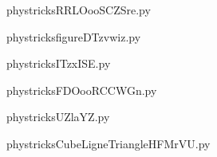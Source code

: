 
    \newcommand{\CaptionFigRRLOooSCZSre}{<+Type your caption here+>}
    \begin{center}
        
    \end{center}
    phystricksRRLOooSCZSre.py

    

    \clearpage
    


    \newcommand{\CaptionFigfigureDTzvwiz}{<+Type your caption here+>}
    \begin{center}
        
    \end{center}
    phystricksfigureDTzvwiz.py

    

    \clearpage
    


    \newcommand{\CaptionFigITzxISE}{<+Type your caption here+>}
    \begin{center}
        
    \end{center}
    phystricksITzxISE.py

    

    \clearpage
    


    \newcommand{\CaptionFigFDOooRCCWGn}{<+Type your caption here+>}
    \begin{center}
        
    \end{center}
    phystricksFDOooRCCWGn.py

    

    \clearpage
    


    \newcommand{\CaptionFigUZlaYZ}{<+Type your caption here+>}
    \begin{center}
        
    \end{center}
    phystricksUZlaYZ.py

    

    \clearpage
    


    \newcommand{\CaptionFigCubeLigneTriangleHFMrVU}{<+Type your caption here+>}
    \begin{center}
        
    \end{center}
    phystricksCubeLigneTriangleHFMrVU.py

